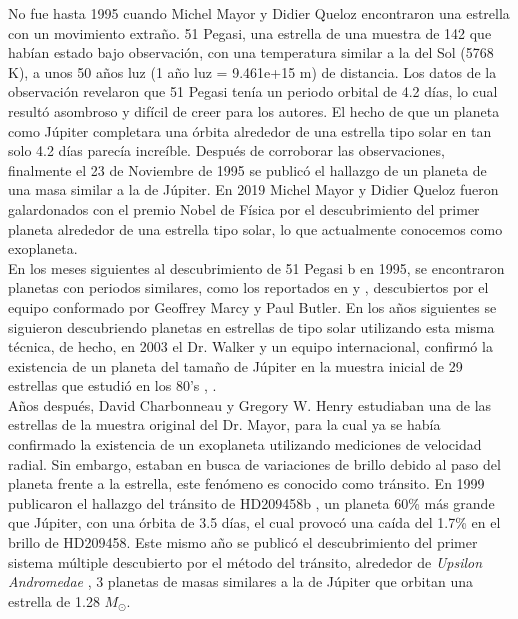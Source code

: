 No fue hasta 1995 cuando Michel Mayor y Didier Queloz \citep{mayor1995jupiter} encontraron una estrella con un movimiento extraño. 51 Pegasi, una estrella de una muestra de 142 que habían estado bajo observación, con una temperatura similar a la del Sol (5768 K), a unos 50 años luz (1 año luz = 9.461e+15 m) de distancia. Los datos de la observación revelaron que 51 Pegasi tenía un periodo orbital de 4.2 días, lo cual resultó asombroso y difícil de creer para los autores. El hecho de que un planeta como Júpiter completara una órbita alrededor de una estrella tipo solar en tan solo 4.2 días parecía increíble. Después de corroborar las observaciones, finalmente el 23 de Noviembre de 1995 se publicó el hallazgo de un planeta de una masa similar a la de Júpiter. En 2019 Michel Mayor y Didier Queloz fueron galardonados con el premio Nobel de Física por el descubrimiento del primer planeta alrededor de una estrella tipo solar, lo que actualmente conocemos como exoplaneta.\\

En los meses siguientes al descubrimiento de 51 Pegasi b en 1995, se encontraron planetas con periodos similares, como los reportados en \cite{Marcy_1996} y \cite{butler1996planet}, descubiertos por el equipo conformado por Geoffrey Marcy y Paul Butler. En los años siguientes se siguieron descubriendo planetas en estrellas de tipo solar utilizando esta misma técnica, de hecho, en 2003 el Dr. Walker y un equipo internacional, confirmó la existencia de un planeta del tamaño de Júpiter en la muestra inicial de 29 estrellas que estudió en los 80's \cite{hatzes2003planetary}, \cite{walker2012first}.\\

Años después, David Charbonneau y Gregory W. Henry estudiaban una de las estrellas de la muestra original del Dr. Mayor, para la cual ya se había confirmado la existencia de un exoplaneta utilizando mediciones de velocidad radial. Sin embargo, estaban en busca de variaciones de brillo debido al paso del planeta frente a la estrella, este fenómeno es conocido como tránsito. En 1999 publicaron el hallazgo del tránsito de HD209458b \cite{charbonneau1999detection}, un planeta 60\% más grande que Júpiter, con una órbita de 3.5 días, el cual provocó una caída del 1.7\% en el brillo de HD209458. Este mismo año se publicó el descubrimiento del primer sistema múltiple descubierto por el método del tránsito, alrededor de \textit{Upsilon Andromedae} \cite{marcy1999three}, 3 planetas de masas similares a la de Júpiter que orbitan una estrella de 1.28 $M_{\odot}$.\\

